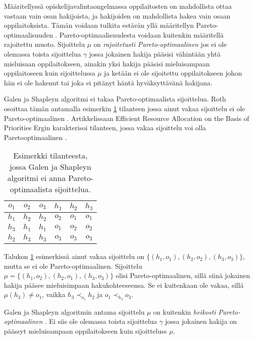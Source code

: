 \documentclass[gradu, twoside]{tktltiki}
\begin{document}
Määritellyssä opiskelijavalintaongelmassa oppilaitosten on mahdollista
ottaa vastaan vain osan hakijoista, ja hakijoiden on mahdollista hakea
vain osaan oppilaitoksista. Tämän voidaan tulkita estävän yllä
määritellyn Pareto-optimaalisuuden \cite{kojima10}.
Pareto-optimaalisuudesta voidaan kuitenkin määritellä rajoitettu
muoto. Sijoittelu $\mu$ on \emph{rajoitetusti Pareto-optimaalinen} jos
ei ole olemassa toista sijoittelua $\gamma$ jossa jokainen hakija
pääsisi vähintään yhtä mieluisaan oppilaitokseen, ainakin yksi hakija
pääsisi mieluisampaan oppilaitoseen kuin sijoittelussa $\mu$ ja ketään
ei ole sijoitettu oppilaitokseen johon hän ei ole hakenut tai joka ei
pitänyt häntä hyväksyttävänä hakijana.

Galen ja Shapleyn algoritmi ei takaa Pareto-optimaalista sijoittelua.
Roth osoittaa tämän antamalla esimerkin \ref{roth_optimaalisuus}
tilanteen jossa ainut vakaa sijoittelu ei ole Pareto-optimaalinen
\cite{roth82}. Artikkelissaan Efficient Resource Allocation on the
Basis of Priorities Ergin karakterisoi tilanteen, jossa vakaa
sijoittelu voi olla Pareto\hyph optimaalinen \cite{ergin02}.

\begin{table}[ht]
  \begin{center}
    \begin{tabular}{ c c c | c c c }
      $o_1$ & $o_2$ & $o_3$ & $h_1$ & $h_2$ & $h_3$ \\
      \hline
      $h_1$ & $h_2$ & $h_2$ & $o_2$ & $o_1$ & $o_1$ \\
      $h_3$ & $h_1$ & $h_1$ & $o_1$ & $o_2$ & $o_2$ \\
      $h_2$ & $h_3$ & $h_3$ & $o_3$ & $o_3$ & $o_3$
    \end{tabular}
    \caption{Esimerkki tilanteesta, jossa Galen ja Shapleyn algoritmi ei
      anna Pareto-optimaalista sijoittelua.}
    \label{roth_optimaalisuus}
  \end{center}
\end{table}

Talukon \ref{roth_optimaalisuus} esimerkissä ainut vakaa sijoittelu on
$\{(h_1, o_1), (h_2, o_2), (h_3, o_3)\}$, mutta se ei ole
Pareto-optimaalinen. Sijoittelu $\mu = \{(h_1, o_2), (h_2, o_1), (h_3,
o_3)\}$ olisi Pareto-optimaalinen, sillä siinä jokainen hakija pääsee
mieluisimpaan hakukohteeseensa. Se ei kuitenkaan ole vakaa, sillä
$\mu(h_3) \neq o_1$, vaikka $h_3 \prec_{o_1} h_2$ ja $o_1 \prec_{h_3}
o_3$.

Galen ja Shapleyn algoritmin antama sijoittelu $\mu$ on kuitenkin
\emph{heikosti Pareto-optimaalinen} \cite{gusfield89}. Ei siis ole
olemassa toista sijoittelua $\gamma$ jossa jokainen hakija on päässyt
mieluisampaan oppilaitokseen kuin sijoitteluss $\mu$.
\end{document}

